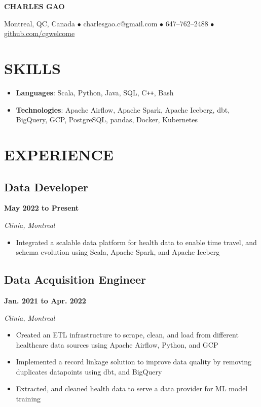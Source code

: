 \documentclass[12pt]{extarticle}
\begin{document}
\begin{center}
\textbf{\huge{CHARLES GAO}}

Montreal, QC, Canada
$\bullet$ charlesgao.c@gmail.com
$\bullet$ 647--762--2488
$\bullet$ \href{https://github.com/cgwelcome}{github.com/cgwelcome}
\end{center}

\section*{SKILLS}
\begin{itemize}
  \item \textbf{Languages}: Scala, Python, Java, SQL, C\texttt{++}, Bash
  \item \textbf{Technologies}: Apache Airflow, Apache Spark, Apache Iceberg, dbt, BigQuery, GCP, PostgreSQL, pandas, Docker, Kubernetes
\end{itemize}



\section*{EXPERIENCE}

\subsection*{Data Developer} \hfill \textbf{May 2022 to Present}

\textit{Clinia, Montreal}
\begin{itemize}
  \item Integrated a scalable data platform for health data to enable time travel, and schema evolution using Scala, Apache Spark, and Apache Iceberg
\end{itemize}

\subsection*{Data Acquisition Engineer} \hfill \textbf{Jan. 2021 to Apr. 2022}

\textit{Clinia, Montreal}
\begin{itemize}
  \item Created an ETL infrastructure to scrape, clean, and load from different healthcare data sources using Apache Airflow, Python, and GCP
  \item Implemented a record linkage solution to improve data quality by removing duplicates datapoints using dbt, and BigQuery
  \item Extracted, and cleaned health data to serve a data provider for ML model training
\end{itemize}
\end{document}
